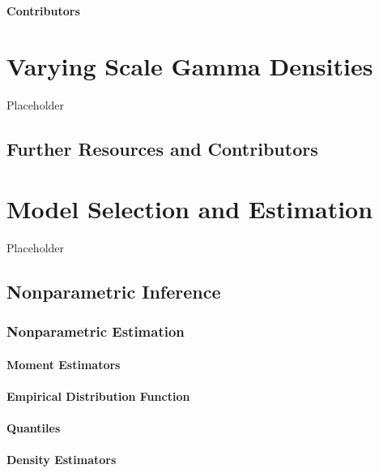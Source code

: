 \documentclass[]{book}
\theoremstyle{definition}
\theoremstyle{definition}
\theoremstyle{definition}
\theoremstyle{remark}
\begin{document}
\subsubsection*{Contributors}\label{contributors-1}

\chapter{Varying Scale Gamma
Densities}\label{varying-scale-gamma-densities}

Placeholder

\section{Further Resources and
Contributors}\label{LM-further-reading-and-resources}

\chapter{Model Selection and Estimation}\label{C:ModelSelection}

Placeholder

\section{Nonparametric Inference}\label{S:MS:NonParInf}

\subsection{Nonparametric Estimation}\label{nonparametric-estimation}

\subsubsection{Moment Estimators}\label{S:MS:MomentEstimator}

\subsubsection{Empirical Distribution
Function}\label{empirical-distribution-function}

\subsubsection{Quantiles}\label{S:MS:QuantileEstimator}

\subsubsection{Density Estimators}\label{density-estimators}
\end{document}
